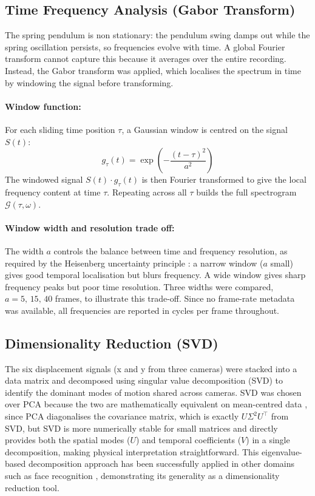 \documentclass[12pt,a4paper]{article}
\begin{document}
\subsection{Time Frequency Analysis (Gabor Transform)}

The spring pendulum is non stationary: the pendulum swing damps out while the spring oscillation persists, so frequencies evolve with time. A global Fourier transform cannot capture this because it averages over the entire recording. Instead, the Gabor transform \citep{gabor1946} was applied, which localises the spectrum in time by windowing the signal before transforming.

\paragraph{Window function:}
For each sliding time position $\tau$, a Gaussian window is centred on the signal $S(t)$:
{\small
\begin{equation}
    g_\tau(t) = \exp\!\left(-\frac{(t-\tau)^2}{a^2}\right)
\end{equation}
}
The windowed signal $S(t)\cdot g_\tau(t)$ is then Fourier transformed to give the local frequency content at time $\tau$. Repeating across all $\tau$ builds the full spectrogram $\mathcal{G}(\tau,\omega)$.

\paragraph{Window width and resolution trade off:}
The width $a$ controls the balance between time and frequency resolution, as required by the Heisenberg uncertainty principle \citep{kutz2013}: a narrow window ($a$ small) gives good temporal localisation but blurs frequency. A wide window gives sharp frequency peaks but poor time resolution. Three widths were compared, $a = 5,\,15,\,40$ frames, to illustrate this trade-off. Since no frame-rate metadata was available, all frequencies are reported in cycles per frame throughout.

\subsection{Dimensionality Reduction (SVD)}

The six displacement signals (x and y from three cameras) were stacked into a data matrix and decomposed using singular value decomposition (SVD) to identify the dominant modes of motion shared across cameras. SVD was chosen over PCA because the two are mathematically equivalent on mean-centred data \citep{kutz2013}, since PCA diagonalises the covariance matrix, which is exactly $U\Sigma^2 U^\top$ from SVD, but SVD is more numerically stable for small matrices and directly provides both the spatial modes ($U$) and temporal coefficients ($V$) in a single decomposition, making physical interpretation straightforward. This eigenvalue-based decomposition approach has been successfully applied in other domains such as face recognition \citep{turk1991}, demonstrating its generality as a dimensionality reduction tool.
\end{document}
